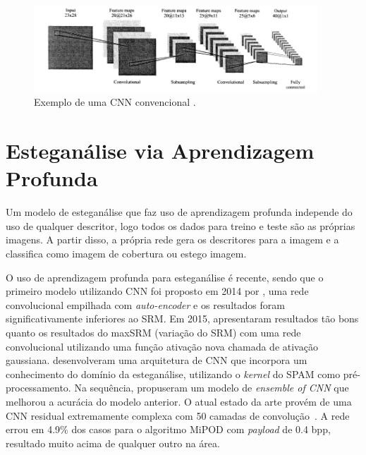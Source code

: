 \begin{figure}[!ht]
\centering
\includegraphics[width=0.95\textwidth]{dados/figuras/cnn.png}
\caption{Exemplo de uma CNN convencional \cite{lawrence1997face}.}
\label{fig:cnn}
\end{figure}

\section{Esteganálise via Aprendizagem Profunda}
\label{sec:stegdeeplearning}

Um modelo de esteganálise que faz uso de aprendizagem profunda independe do uso de qualquer descritor, logo todos os dados para treino e teste são as próprias imagens. A partir disso, a própria rede gera os descritores para a imagem e a classifica como imagem de cobertura ou estego imagem.

O uso de aprendizagem profunda para esteganálise é recente, sendo que o primeiro modelo utilizando CNN foi proposto em 2014 por , uma rede convolucional empilhada com \textit{auto-encoder} e os resultados foram significativamente inferiores ao SRM. Em 2015,  apresentaram resultados tão bons quanto os resultados do maxSRM (variação do SRM) com uma rede convolucional utilizando uma função ativação nova chamada de ativação gaussiana.  desenvolveram uma arquitetura de CNN que incorpora um conhecimento do domínio da esteganálise, utilizando o \textit{kernel} do SPAM como pré-processamento. Na sequência,  propuseram um modelo de \textit{ensemble of CNN} que melhorou a acurácia do modelo anterior. O atual estado da arte provém de uma CNN residual extremamente complexa com 50 camadas de convolução~\cite{wu2017deep}. A rede errou em 4.9\% dos casos para o algoritmo MiPOD com \textit{payload} de 0.4 bpp, resultado muito acima de qualquer outro na área.
